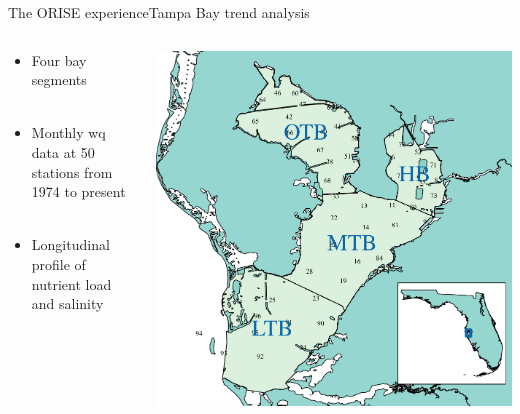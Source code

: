 \documentclass[serif]{beamer}\usepackage[]{graphicx}\usepackage[]{color}
\begin{document}
\begin{frame}{The ORISE experience}{Tampa Bay trend analysis}
\begin{columns}
\begin{column}{0.5\textwidth}
\begin{itemize}
\item Four bay segments\\~\\
\item Monthly wq data at 50 stations from 1974 to present \\~\\
\item Longitudinal profile of nutrient load and salinity \\~\\
\end{itemize}
\vspace{0cm}\hspace*{15pt}
\end{column}
\begin{column}{0.5\textwidth}
\centerline{\includegraphics[width = \textwidth]{fig/tb_map.pdf}}
\end{column}
\end{columns}
\end{frame}
\end{document}
